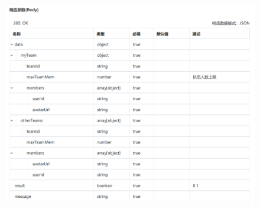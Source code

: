                             \begin{figure}[h]
                                \centering
                                \includegraphics[height=16.0cm,width=14.0cm]{design/image/api15.png} 
                                \end{figure}  
                                \newpage              

